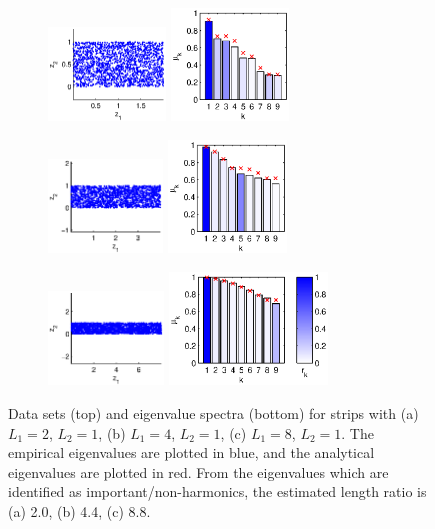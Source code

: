 \documentclass[preprint]{elsarticle}
\begin{document}
\begin{figure}[t]
\centering
\begin{subfigure}{0.3\textwidth}
\includegraphics[height=2.5cm]{strip_data_L2}
\includegraphics[height=3cm]{strip_spectrum_L2}
\caption{}
\end{subfigure}
%
\hfill
%
\begin{subfigure}{0.3\textwidth}
\includegraphics[height=2.5cm]{strip_data_L4}
\includegraphics[height=3cm]{strip_spectrum_L4}
\caption{}
\end{subfigure}
%
\hfill
%
\begin{subfigure}{0.35\textwidth}
\includegraphics[height=2.5cm]{strip_data_L8}
\includegraphics[height=3cm]{strip_spectrum_L8}
\caption{}
\end{subfigure}
%
\caption{Data sets (top) and eigenvalue spectra (bottom) for strips with (a) $L_1 = 2$, $L_2 = 1$, (b) $L_1 = 4$, $L_2 = 1$, (c) $L_1 = 8$, $L_2 = 1$. The empirical eigenvalues are plotted in blue, and the analytical eigenvalues are plotted in red. From the eigenvalues which are identified as important/non-harmonics, the estimated length ratio is (a) 2.0, (b) 4.4, (c) 8.8.  }
\label{fig:strip_compare_analytic}
\end{figure}
\end{document}
